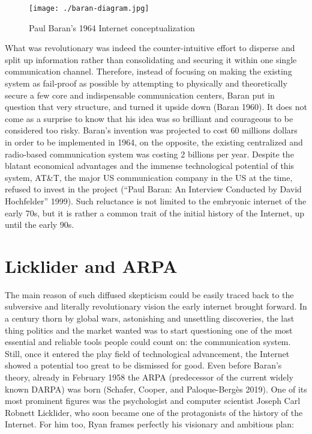 \documentclass[
  a4paper,
]{book}
\begin{document}
\begin{figure}
\centering
\texttt{[image: ./baran-diagram.jpg]}
\caption{Paul Baran's 1964 Internet conceptualization}
\end{figure}

What was revolutionary was indeed the counter-intuitive effort to disperse and split up information rather than consolidating and securing it within one single communication channel. Therefore, instead of focusing on making the existing system as fail-proof as possible by attempting to physically and theoretically secure a few core and indispensable communication centers, Baran put in question that very structure, and turned it upside down {(Baran 1960)}. It does not come as a surprise to know that his idea was so brilliant and courageous to be considered too risky. Baran's invention was projected to cost 60 millions dollars in order to be implemented in 1964, on the opposite, the existing centralized and radio-based communication system was costing 2 billions per year. Despite the blatant economical advantages and the immense technological potential of this system, AT\&T, the major US communication company in the US at the time, refused to invest in the project {({``Paul {Baran}: {An Interview Conducted} by {David Hochfelder}''} 1999)}. Such reluctance is not limited to the embryonic internet of the early 70s, but it is rather a common trait of the initial history of the Internet, up until the early 90s.

\hypertarget{licklider-and-arpa}{%
\section{Licklider and ARPA}\label{licklider-and-arpa}}

The main reason of such diffused skepticism could be easily traced back to the subversive and literally revolutionary vision the early internet brought forward. In a century thorn by global wars, astonishing and unsettling discoveries, the last thing politics and the market wanted was to start questioning one of the most essential and reliable tools people could count on: the communication system. Still, once it entered the play field of technological advancement, the Internet showed a potential too great to be dismissed for good. Even before Baran's theory, already in February 1958 the ARPA (predecessor of the current widely known DARPA) was born {(Schafer, Cooper, and Paloque-Bergès 2019)}. One of its most prominent figures was the psychologist and computer scientist Joseph Carl Robnett Licklider, who soon became one of the protagonists of the history of the Internet. For him too, Ryan frames perfectly his visionary and ambitious plan:
\end{document}

